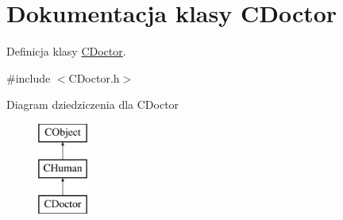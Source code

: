 \hypertarget{class_c_doctor}{}\section{Dokumentacja klasy C\+Doctor}
\label{class_c_doctor}


Definicja klasy \mbox{\hyperlink{class_c_doctor}{C\+Doctor}}.  




{\ttfamily \#include $<$C\+Doctor.\+h$>$}

Diagram dziedziczenia dla C\+Doctor\begin{figure}[H]
\begin{center}
\leavevmode
\includegraphics[height=3.000000cm]{class_c_doctor}
\end{center}
\end{figure}
